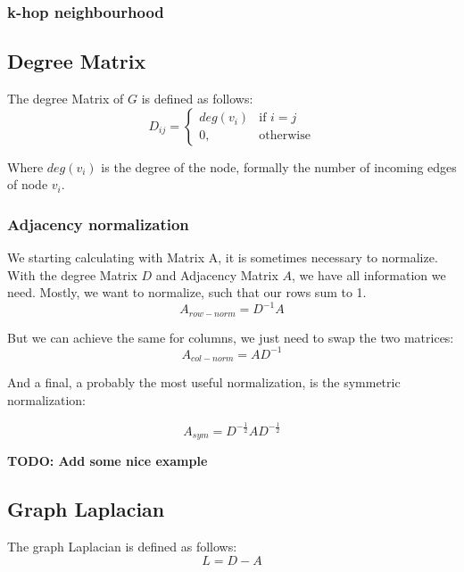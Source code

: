 \subsubsection{k-hop neighbourhood}

\subsection{Degree Matrix}

The degree Matrix of $G$ is defined as follows:
\begin{equation}
    D_{ij} =    
    \begin{cases}
        deg(v_i)  & \text{if } i = j \\
        0, & \text{otherwise}
    \end{cases}
\end{equation}

Where $deg(v_i)$ is the degree of the node, formally the number of incoming edges of node $v_i$.

\subsubsection{Adjacency normalization}
We starting calculating with Matrix A, it is sometimes necessary to normalize.
With the degree Matrix $D$ and Adjacency Matrix $A$, we have all information we need.
Mostly, we want to normalize, such that our rows sum to 1.
\begin{equation}
    A_{row-norm} = D^{-1} A
\end{equation}

But we can achieve the same for columns, we just need to swap the two matrices:
\begin{equation}
    A_{col-norm} = A D^{-1}
\end{equation}

And a final, a probably the most useful normalization, is the symmetric normalization:

\begin{equation}
    A_{sym} =  D^{-\frac{1}{2}} A D^{-\frac{1}{2}}
\end{equation}

\textbf{TODO: Add some nice example}

\subsection{Graph Laplacian}
The graph Laplacian is defined as follows:
\begin{equation}
    L = D - A
\end{equation}


